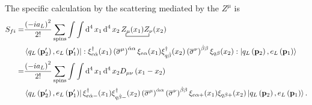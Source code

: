 The specific calculation by the scattering mediated by the $Z^{\mu}$ is 
\begin{align}
  S_{fi}=&\frac{\left( -ia_L \right)^{2}}{2!}\sum_{\text{spins}}\int\int \operatorname{d}^4x_1 \operatorname{d}^4x_2
\bcontraction{\,}{Z_{\mu}}{(x_1)}{Z_{\nu}}\,Z_{\mu}(x_1)Z_{\nu}(x_2) \nonumber\\
&\left\langle q_L \left(\mathbf{p}'_2\right),e_L\left(\mathbf{p}'_1\right) \right|
  : \xi^{\dagger}_{e\dot{\alpha}}(x_1)\left( \overline{\sigma}^{\mu} \right)^{\dot{\alpha}\alpha}\xi_{e\alpha}(x_1)\xi^{\dagger}_{q\dot{\beta}}(x_2)\left( \overline{\sigma}^{\nu} \right)^{\dot{\beta}\beta}\xi_{q\beta}(x_2):
 \left| q_L\left(\mathbf{p}_2\right) ,e_L \left(\mathbf{p}_1\right)  \right\rangle \nonumber\\
=&\frac{\left( -ia_L \right)^{2}}{2!}\sum_{\text{spins}}\int\int \operatorname{d}^4x_1 \operatorname{d}^4x_2
D_{\mu\nu} \left( x_1-x_2 \right)\nonumber\\
&\left\langle q_L \left(\mathbf{p}'_2\right),e_L\left(\mathbf{p}'_1\right)\right|
   \xi^{\dagger}_{e\dot{\alpha} -}(x_1)\xi^{\dagger}_{q\dot{\beta}-}(x_2)\left( \overline{\sigma}^{\mu} \right)^{\dot{\alpha}\alpha}\left( \overline{\sigma}^{\nu} \right)^{\dot{\beta}\beta}\xi_{e\alpha +}(x_1)\xi_{q\beta +}(x_2)
 \left| q_L\left(\mathbf{p}_2\right), e_L \left(\mathbf{p}_1\right)\right\rangle. 
\end{align}



